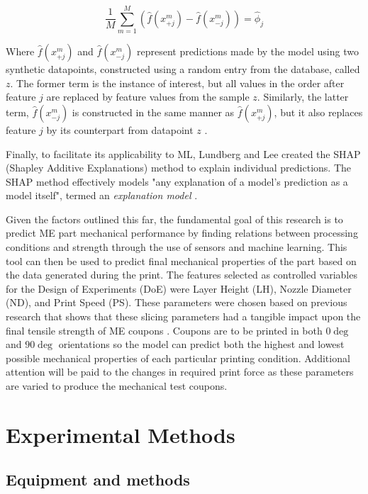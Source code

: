 \documentclass[main.tex]{subfiles}
\begin{document}
\begin{equation}
	\frac{1}{M}\sum_{m=1}^{M} (\hat{f}(x^{m}_{+j})-\hat{f}(x^{m}_{-j})) = \hat{\phi}_{j}
\end{equation}

Where $\hat{f}(x^{m}_{+j})$ and $\hat{f}(x^{m}_{-j})$ represent predictions made by the model using two synthetic datapoints, constructed using a random entry from the database, called $z$. The former term is the instance of interest, but all values in the order after feature $j$ are replaced by feature values from the sample $z$. Similarly, the latter term, $\hat{f}(x^{m}_{-j})$ is constructed in the same manner as $\hat{f}(x^{m}_{+j})$, but it also replaces feature $j$ by its counterpart from datapoint $z$ \cite{Molnar2021}. 

Finally, to facilitate its applicability to ML, Lundberg and Lee created the SHAP (Shapley Additive Explanations) method to explain individual predictions. The SHAP method effectively models "any explanation of a model's prediction as a model itself", termed an \emph{explanation model} \cite{NIPS2017_8a20a862}.

Given the factors outlined this far, the fundamental goal of this research is to predict ME part mechanical performance by finding relations between processing conditions and strength through the use of sensors and machine learning. This tool can then be used to predict final mechanical properties of the part based on the data generated during the print. The features selected as controlled variables for the Design of Experiments (DoE) were Layer Height (LH), Nozzle Diameter (ND), and Print Speed (PS). These parameters were chosen based on previous research that shows that these slicing parameters had a tangible impact upon the final tensile strength of ME coupons \cite{Koch2017, Rankouhi2016}. Coupons are to be printed in both $0\deg$ and $90\deg$ orientations so the model can predict both the highest and lowest possible mechanical properties of each particular printing condition. Additional attention will be paid to the changes in required print force as these parameters are varied to produce the mechanical test coupons.

\section{Experimental Methods} \label{sec:ml_meth}

\subsection{Equipment and methods}\label{ssec:datag}
\end{document}
